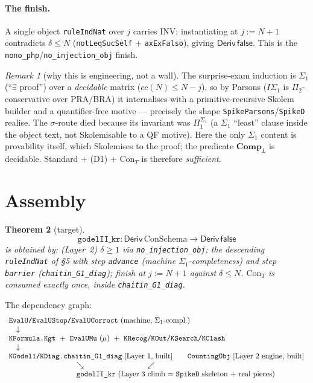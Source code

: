\documentclass[11pt]{article}
\theoremstyle{plain}
\newtheorem{theorem}{Theorem}[section]
\theoremstyle{definition}
\theoremstyle{remark}
\newtheorem{remark}[theorem]{Remark}
\newcommand{\Deriv}{\mathsf{Deriv}}
\newcommand{\Con}{\mathrm{Con}_T}
\newcommand{\Comp}{\mathbf{Comp}}
\newcommand{\false}{\mathsf{false}}
\begin{document}
\paragraph{The finish.} A single object \texttt{ruleIndNat} over $j$ carries
$\mathrm{INV}$; instantiating at $j := N+1$ contradicts $\delta \le N$
(\texttt{notLeqSucSelf} + \texttt{axExFalso}), giving $\Deriv\,\false$. This is the
\texttt{mono\_php}/\texttt{no\_injection\_obj} finish.

\begin{remark}[why this is engineering, not a wall]
The surprise-exam induction is $\Sigma_1$ (``$\exists$ proof'') over a
\emph{decidable} matrix ($\mathit{cc}(N)\le N-j$), so by Parsons
($I\Sigma_1$ is $\Pi_2$-conservative over PRA/BRA) it internalises with a
primitive-recursive Skolem builder and a quantifier-free motive --- precisely the
shape \texttt{SpikeParsons}/\texttt{SpikeD} realise. The $\sigma$-route died
because its invariant was $\Pi_1^{\Sigma_1}$ (a $\Sigma_1$ ``least'' clause inside
the object text, not Skolemisable to a QF motive). Here the only $\Sigma_1$ content
is provability itself, which Skolemises to the proof; the predicate $\Comp_L$ is
decidable. Standard + (D1) + $\Con$ is therefore \emph{sufficient}.
\end{remark}

\section{Assembly}

\begin{theorem}[target]
\[
  \texttt{godelII\_kr} : \Deriv\,\mathrm{ConSchema} \longrightarrow \Deriv\,\false
\]
is obtained by: (Layer~2) $\delta \ge 1$ via \texttt{no\_injection\_obj}; the
descending \texttt{ruleIndNat} of \S5 with step \texttt{advance} (machine
$\Sigma_1$-completeness) and step \texttt{barrier}
(\texttt{chaitin\_G1\_diag}); finish at $j:=N+1$ against $\delta \le N$.
$\Con$ is consumed exactly once, inside \texttt{chaitin\_G1\_diag}.
\end{theorem}

The dependency graph:
\[
\begin{array}{l}
\texttt{EvalU/EvalUStep/EvalUCorrect}\ \text{(machine, $\Sigma_1$-compl.)}\\
\quad\downarrow\\
\texttt{KFormula.Kgt}\ +\ \texttt{EvalUMu}\ (\mu)\ +\ \texttt{KRecog/KOut/KSearch/KClash}\\
\quad\downarrow\\
\texttt{KGodel1/KDiag.chaitin\_G1\_diag}\ \text{[Layer 1, built]}
\qquad
\texttt{CountingObj}\ \text{[Layer 2 engine, built]}\\
\hspace{3.2cm}\searrow \hspace{3.0cm}\swarrow\\
\hspace{3.2cm}\texttt{godelII\_kr}\ \text{(Layer 3 climb = \texttt{SpikeD} skeleton + real pieces)}
\end{array}
\]
\end{document}
